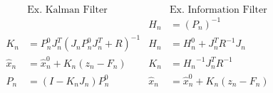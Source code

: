 \begin{algorithm}[t]
\vspace{-.05in}
\begin{gather*}
\begin{aligned}
&\text{Ex. Kalman Filter}                           &       &\text{Ex. Information Filter} \\
&                                                   &       H_n &= \left(P_n\right)^{-1} \\
K_n &= P_n^0 J_n^T(J_n P_n^0 J_n^T + R)^{-1}        &       H_n &= H_n^0 + J_n^T R^{-1} J_n \\
\hat{x}_n &= \hat{x}_n^0 + K_n(z_n - F_n)           &       K_n &= {H_n}^{-1} J_n^T R^{-1} \\
P_n &= (I - K_n J_n)P_n^0                           &       \hat{x}_n &= \hat{x}_n^0 + K_n (z_n - F_n)
\end{aligned}
\end{gather*}
\caption{
% 
% 
Analogy of EKF and EIF.
% 
% 
}
\label{tab:eif}
\end{algorithm}